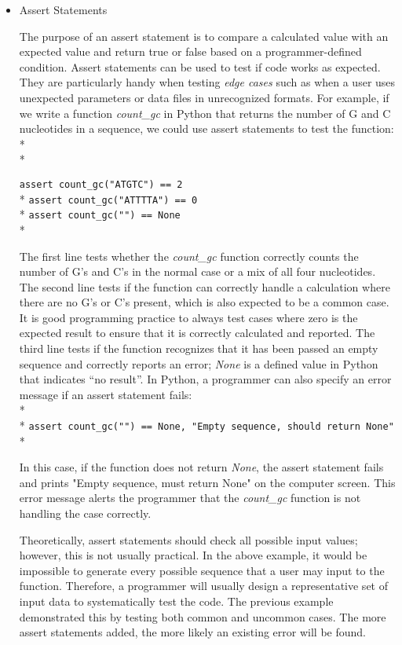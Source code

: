 \documentclass[ChapterTOCs,krantz2]{krantz} %
\begin{document}
\begin{itemize}
\item Assert Statements

The purpose of an assert statement is to compare
a calculated value with an expected value and return true or false
based on a programmer-defined condition. Assert statements can be used to
test if code works as expected.  They are
particularly handy when testing \emph{edge cases} such as when a user
uses unexpected parameters or data files in unrecognized formats.
For example, if we write a function \emph{count\_gc} in Python that returns the number of
G and C nucleotides in a sequence, we could use assert statements to test the
function:\\* \\*

\texttt{assert count\_gc("ATGTC") == 2}\\*
\texttt{assert count\_gc("ATTTTA") == 0}\\*
\texttt{assert count\_gc("") == None}\\*

The first line tests whether the \emph{count\_gc} function correctly counts the number
of G's and C's in the normal case or a mix of all four nucleotides.  The second
line tests if the function can correctly handle a calculation where there are
no G's or C's present, which is also expected to be a common case.  It is good
programming practice to always test cases where zero is the expected result to
ensure that it is correctly calculated and reported.  The third line tests if
the function recognizes that it has been passed an empty sequence and correctly
reports an error; \emph{None} is a defined value in Python that indicates ``no result''. In
Python, a programmer can also specify an error message if an assert statement
fails:\\* \\*
\texttt{assert count\_gc("") == None, "Empty sequence, should return None"}\\*

In this case, if the function does not return \emph{None}, the assert statement
fails and prints "Empty sequence, must return None" on the computer
screen.
This error message alerts the programmer that the \emph{count\_gc} function
is not handling the case correctly.  

Theoretically, assert statements should check all possible input
values; however, this is not usually practical. In the above example, it
would be impossible to generate every possible sequence that a user may
input to the function.  Therefore, a programmer will usually design
a representative set of input data to systematically test the code.  The
previous example demonstrated this by testing 
both common and uncommon cases.  The more assert statements
added, the more likely an existing error will be found.  


\end{itemize}
\end{document}
